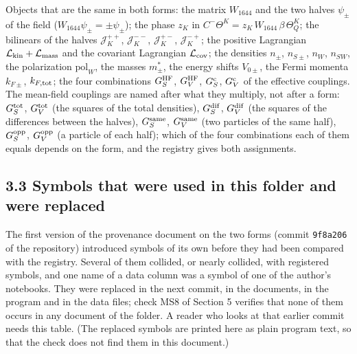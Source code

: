 \documentclass[
  10pt,
]{article}
\begin{document}
Objects that are the same in both forms: the matrix \(W_{1644}\) and the
two halves \(\psi_\pm\) of the field (\(W_{1644}\psi_\pm=\pm\psi_\pm\));
the phase \(z_K\) in \(C^-\Theta^K=z_K\,W_{1644}\,\beta\,\Theta_Q^K\);
the bilinears of the halves \(\mathcal J_K^{++}\),
\(\mathcal J_K^{--}\), \(\mathcal J_K^{+-}\), \(\mathcal J_K^{-+}\); the
positive Lagrangian \(\mathcal L_{\rm kin}+\mathcal L_{\rm mass}\) and
the covariant Lagrangian \(\mathcal L_{\rm cov}\); the densities
\(n_\pm\), \(n_{S\pm}\), \(n_W\), \(n_{SW}\), the polarization
\(\mathrm{pol}_W\), the masses \(m^*_\pm\), the energy shifts
\(V_{0\pm}\), the Fermi momenta \(k_{F\pm}\), \(k_{F,\rm tot}\); the
four combinations \(G_S^{\rm HF}\), \(G_V^{\rm HF}\), \(G_S^{\rm c}\),
\(G_V^{\rm c}\) of the effective couplings. The mean-field couplings are
named after what they multiply, not after a form: \(G_S^{\rm tot}\),
\(G_V^{\rm tot}\) (the squares of the total densities),
\(G_S^{\rm dif}\), \(G_V^{\rm dif}\) (the squares of the differences
between the halves), \(G_S^{\rm same}\), \(G_V^{\rm same}\) (two
particles of the same half), \(G_S^{\rm opp}\), \(G_V^{\rm opp}\) (a
particle of each half); which of the four combinations each of them
equals depends on the form, and the registry gives both assignments.

\hypertarget{symbols-that-were-used-in-this-folder-and-were-replaced}{%
\subsection{3.3 Symbols that were used in this folder and were
replaced}\label{symbols-that-were-used-in-this-folder-and-were-replaced}}

The first version of the provenance document on the two forms (commit
\texttt{9f8a206} of the repository) introduced symbols of its own before
they had been compared with the registry. Several of them collided, or
nearly collided, with registered symbols, and one name of a data column
was a symbol of one of the author's notebooks. They were replaced in the
next commit, in the documents, in the program and in the data files;
check MS8 of Section 5 verifies that none of them occurs in any document
of the folder. A reader who looks at that earlier commit needs this
table. (The replaced symbols are printed here as plain program text, so
that the check does not find them in this document.)
\end{document}
